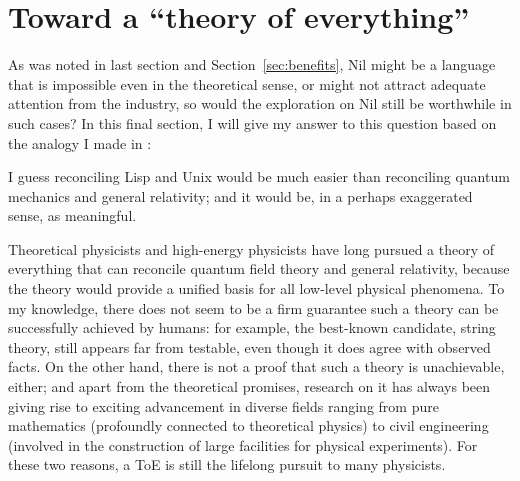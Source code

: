 \section{Toward a ``theory of everything''}\label{sec:toe}

As was noted in last section and Section~\ref{sec:benefits}, Nil might be a
language that is impossible even in the theoretical sense, or might not attract
adequate attention from the industry, so would the exploration on Nil still be
worthwhile in such cases?  In this final section, I will give my answer
to this question based on the analogy I made in \parencite{vector2018c}:
\begin{quoting}
	I guess reconciling Lisp and Unix would be much easier than
	reconciling quantum mechanics and general relativity; and
	it would be, in a perhaps exaggerated sense, as meaningful.
\end{quoting}

Theoretical physicists and high-energy physicists have long pursued a theory
of everything that can reconcile quantum field theory and general relativity,
because the theory would provide a unified basis for all low-level physical
phenomena.  To my knowledge, there does not seem to be a firm guarantee such
a theory can be successfully achieved by humans: for example, the best-known
candidate, string theory, still appears far from testable, even though it does
agree with observed facts.  On the other hand, there is not a proof that such
a theory is unachievable, either; and apart from the theoretical promises,
research on it has always been giving rise to exciting advancement in diverse
fields ranging from pure mathematics (profoundly connected to theoretical
physics) to civil engineering (involved in the construction of large
facilities for physical experiments).  For these two reasons,
a ToE is still the lifelong pursuit to many physicists.

